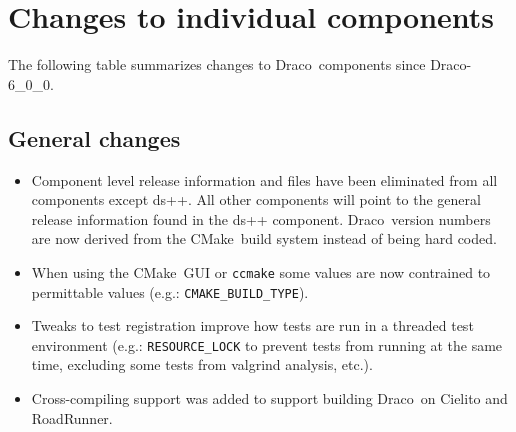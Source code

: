 \documentclass[note]{ResearchNote_pdf}
\newcommand{\draco}{Draco}
\newcommand{\cmake}{\textsf{CMake}}
\newcommand{\scons}{\textsf{SCons}}
\begin{document}
\section{Changes to individual components}
\label{sec:changes}
The following table summarizes changes to \draco\ components since
\draco-6\_0\_0. 

\subsection{General changes}
\label{changes:general}
\begin{itemize}

\item Component level release information and files have been
  eliminated from all components except \textsf{ds++}.  All other
  components will point to the general release information found in
  the \textsf{ds++} component.  \draco\ version numbers are now
  derived from the \cmake\ build system instead of being hard coded.
\item When using the \cmake\ GUI or \texttt{ccmake} some values are
  now contrained to permittable values (e.g.:
  \texttt{CMAKE\_BUILD\_TYPE}). 
\item Tweaks to test registration improve how tests are run in a
  threaded test environment (e.g.: \texttt{RESOURCE\_LOCK} to prevent
  tests from running at the same time, excluding some tests from
  valgrind analysis, etc.).
\item Cross-compiling support was added to support building \draco\ on
  Cielito and RoadRunner.

\end{itemize}

\end{document}
